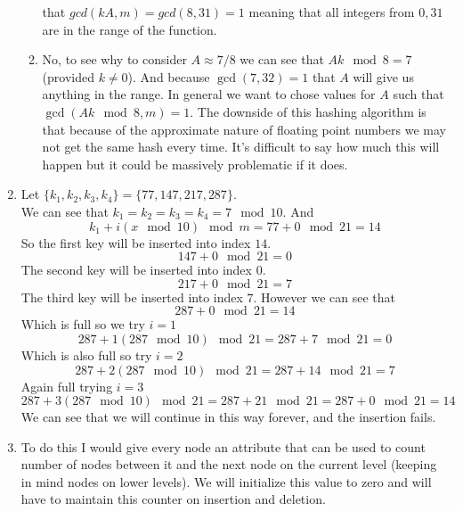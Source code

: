 \documentclass[11pt]{article}
\begin{document}
\begin{enumerate}
\begin{enumerate}
				that $gcd(kA,m) = gcd(8,31) = 1$ meaning that
				all integers from $0,31$ are in the range of
				the function.
			\item No, to see why to consider $A \approx 7/8$ we can
				see that $Ak \mod 8 = 7$ (provided $k \neq 0$). And because
				$\gcd(7,32) = 1$ that $A$ will give us anything in the
				range. In general we want to chose values for
				$A$ such that $\gcd(Ak \mod 8,m) = 1$. The
				downside of this hashing algorithm is that
				because of the approximate nature of floating
				point numbers we may not get the same hash every
				time. It's difficult to say how much this will
				happen but it could be massively problematic if
				it does.
		\end{enumerate}
	\item Let $\{k_1,k_2,k_3,k_4\} = \{77,147,217,287\}$.\\
		We can see that $k_1=k_2=k_3=k_4= 7 \mod 10$.
		And
		$$k_1 + i(x \mod 10) \mod m = 77 + 0 \mod 21 = 14$$
		So the first key will be inserted into index $14$.
		$$ 147 + 0 \mod 21 = 0$$
		The second key will be inserted into index $0$.
		$$ 217 + 0 \mod 21 = 7$$
		The third key will be inserted into index $7$.
		However we can see that 
		$$ 287 + 0 \mod 21 = 14$$
		Which is full so we try $i = 1$
		$$ 287 + 1(287 \mod 10) \mod 21 = 287 + 7 \mod 21 = 0$$
		Which is also full so try $ i = 2 $
		$$ 287 + 2(287 \mod 10) \mod 21 = 287 + 14 \mod 21 = 7$$
		Again full trying $i = 3$
		$$ 287 + 3(287 \mod 10) \mod 21 = 287 + 21 \mod 21  = 287 + 0
		\mod 21 = 14$$
		We can see that we will continue in this way forever, and the
		insertion fails.
	\item To do this I would give every node an attribute that can be used
		to count number of nodes between it and the next node on the
		current level (keeping in mind nodes on lower levels). We will
		initialize this value to zero and will have to maintain this 
		counter on insertion and deletion.
\end{enumerate}
\end{document}
